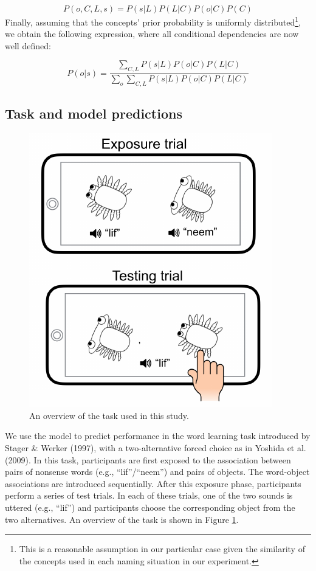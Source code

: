 \documentclass[10pt, letterpaper]{article}
\newenvironment{CodeChunk}{}{}
\begin{document}
\[P(o,C,L,s) = P(s|L)P(L|C)P(o|C)P(C) \] Finally, assuming that the
concepts' prior probability is uniformly
distributed\footnote{This is a reasonable assumption in our particular case given the similarity of the concepts used in each naming situation in our experiment.},
we obtain the following expression, where all conditional dependencies
are now well defined:

\begin{equation}
P(o|s) = \frac{\sum_{C,L} P(s|L)P(o|C)P(L|C)}{\sum_{o} \sum_{C,L} P(s|L)P(o|C)P(L|C)}
\end{equation}

\subsection{Task and model
predictions}\label{task-and-model-predictions}

\begin{CodeChunk}
\begin{figure}[t]

{\centering \includegraphics{figs/task-1} 

}

\caption{\label{fig:task}An overview of the task used in this study.}\label{fig:task}
\end{figure}
\end{CodeChunk}

We use the model to predict performance in the word learning task
introduced by Stager \& Werker (1997), with a two-alternative forced
choice as in Yoshida et al. (2009). In this task, participants are first
exposed to the association between pairs of nonsense words (e.g.,
``lif''/``neem'') and pairs of objects. The word-object associations are
introduced sequentially. After this exposure phase, participants perform
a series of test trials. In each of these trials, one of the two sounds
is uttered (e.g., ``lif'') and participants choose the corresponding
object from the two alternatives. An overview of the task is shown in
Figure \ref{fig:task}.
\end{document}
